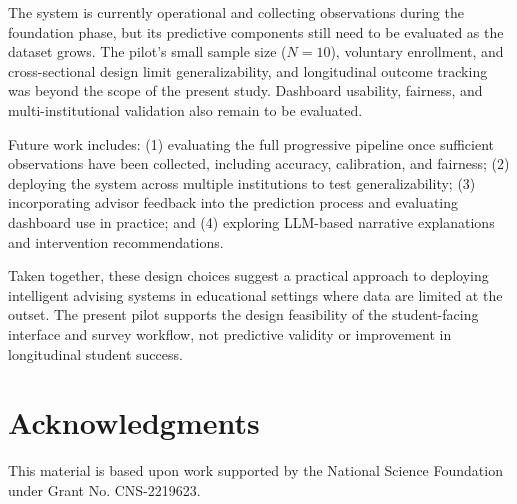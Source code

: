 \documentclass[letterpaper,11pt]{article}
\begin{document}
The system is currently operational and collecting observations during the foundation phase, but its predictive components still need to be evaluated as the dataset grows. The pilot's small sample size ($N=10$), voluntary enrollment, and cross-sectional design limit generalizability, and longitudinal outcome tracking was beyond the scope of the present study. Dashboard usability, fairness, and multi-institutional validation also remain to be evaluated.

Future work includes: (1) evaluating the full progressive pipeline once sufficient observations have been collected, including accuracy, calibration, and fairness; (2) deploying the system across multiple institutions to test generalizability; (3) incorporating advisor feedback into the prediction process and evaluating dashboard use in practice; and (4) exploring LLM-based narrative explanations and intervention recommendations.

Taken together, these design choices suggest a practical approach to deploying intelligent advising systems in educational settings where data are limited at the outset. The present pilot supports the design feasibility of the student-facing interface and survey workflow, not predictive validity or improvement in longitudinal student success.


\section{Acknowledgments}

This material is based upon work supported by the National Science Foundation under Grant No. CNS-2219623.

\begin{sloppypar}
\printbibliography[title={REFERENCES}]
\end{sloppypar}
\end{document}
